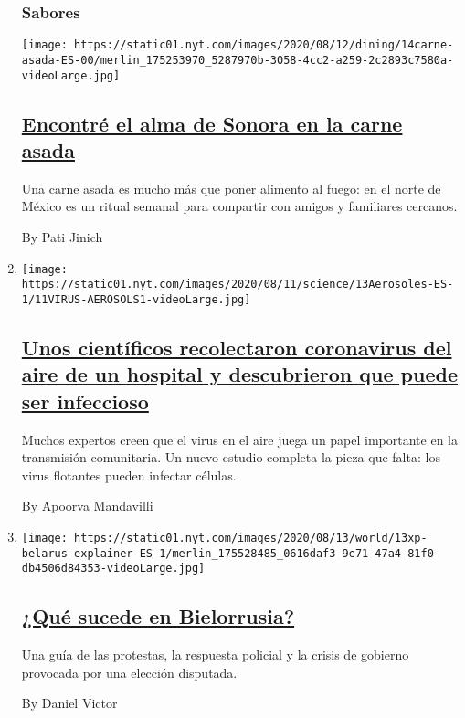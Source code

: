 \begin{enumerate}
{  \subsubsection{Sabores}\label{sabores}}

  \texttt{[image: https://static01.nyt.com/images/2020/08/12/dining/14carne-asada-ES-00/merlin\_175253970\_5287970b-3058-4cc2-a259-2c2893c7580a-videoLarge.jpg]}

  \hypertarget{encontruxe9-el-alma-de-sonora-en-la-carne-asada}{%
  \subsection{\texorpdfstring{\href{/es/2020/08/14/espanol/sonora-carne-asada.html}{Encontré
  el alma de Sonora en la carne
  asada}}{Encontré el alma de Sonora en la carne asada}}\label{encontruxe9-el-alma-de-sonora-en-la-carne-asada}}

  Una carne asada es mucho más que poner alimento al fuego: en el norte
  de México es un ritual semanal para compartir con amigos y familiares
  cercanos.

  By Pati Jinich
\item
  \texttt{[image: https://static01.nyt.com/images/2020/08/11/science/13Aerosoles-ES-1/11VIRUS-AEROSOLS1-videoLarge.jpg]}

  \hypertarget{unos-cientuxedficos-recolectaron-coronavirus-del-aire-de-un-hospital-y-descubrieron-que-puede-ser-infeccioso}{%
  \subsection{\texorpdfstring{\href{/es/2020/08/13/espanol/coronavirus-en-aire.html}{Unos
  científicos recolectaron coronavirus del aire de un hospital y
  descubrieron que puede ser
  infeccioso}}{Unos científicos recolectaron coronavirus del aire de un hospital y descubrieron que puede ser infeccioso}}\label{unos-cientuxedficos-recolectaron-coronavirus-del-aire-de-un-hospital-y-descubrieron-que-puede-ser-infeccioso}}

  Muchos expertos creen que el virus en el aire juega un papel
  importante en la transmisión comunitaria. Un nuevo estudio completa la
  pieza que falta: los virus flotantes pueden infectar células.

  By Apoorva Mandavilli
\item
  \texttt{[image: https://static01.nyt.com/images/2020/08/13/world/13xp-belarus-explainer-ES-1/merlin\_175528485\_0616daf3-9e71-47a4-81f0-db4506d84353-videoLarge.jpg]}

  \hypertarget{quuxe9-sucede-en-bielorrusia}{%
  \subsection{\texorpdfstring{\href{/es/2020/08/13/espanol/mundo/protestas-bielorrusia.html}{¿Qué
  sucede en
  Bielorrusia?}}{¿Qué sucede en Bielorrusia?}}\label{quuxe9-sucede-en-bielorrusia}}

  Una guía de las protestas, la respuesta policial y la crisis de
  gobierno provocada por una elección disputada.

  By Daniel Victor
\end{enumerate}

